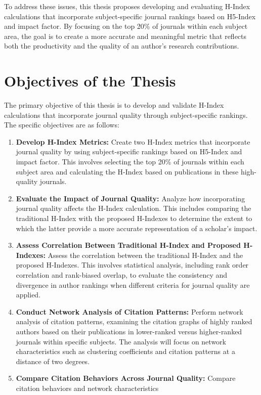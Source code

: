 To address these issues, this thesis proposes developing and evaluating H-Index
calculations that incorporate subject-specific journal rankings based on
H5-Index and impact factor. By focusing on the top 20\% of journals within each
subject area, the goal is to create a more accurate and meaningful metric that
reflects both the productivity and the quality of an author's research
contributions.

\section{Objectives of the Thesis}
The primary objective of this thesis is to develop and validate H-Index
calculations that incorporate journal quality through subject-specific
rankings. The specific objectives are as follows:
\begin{enumerate}
    \item \textbf{Develop H-Index Metrics:} Create two H-Index metrics that incorporate journal quality
          by using subject-specific rankings based on H5-Index and impact factor.
          This involves selecting the top 20\% of journals within each subject area and calculating the H-Index based on publications
          in these high-quality journals.
    \item \textbf{Evaluate the Impact of Journal Quality:} Analyze how incorporating journal quality affects the H-Index calculation.
          This includes comparing the traditional H-Index with the proposed H-Indexes to determine the extent to which the latter
          provide a more accurate representation of a scholar’s impact.
    \item \textbf{Assess Correlation Between Traditional H-Index and Proposed H-Indexes:} Assess the correlation between the traditional H-Index
          and the proposed H-Indexes. This involves statistical analysis, including rank order correlation
          and rank-biased overlap, to evaluate the consistency and divergence in author rankings when different criteria for journal quality are applied.
    \item \textbf{Conduct Network Analysis of Citation Patterns:} Perform network analysis of citation patterns,
          examining the citation graphs of highly ranked authors based on their publications in lower-ranked versus
          higher-ranked journals within specific subjects. The analysis will focus on network characteristics such as
          clustering coefficients and citation patterns at a distance of two degrees.
    \item \textbf{Compare Citation Behaviors Across Journal Quality:} Compare citation behaviors and network characteristics

\end{enumerate}
